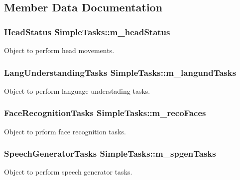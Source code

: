 \subsection{Member Data Documentation}
\subsubsection[{\texorpdfstring{m\+\_\+head\+Status}{m_headStatus}}]{\setlength{\rightskip}{0pt plus 5cm}Head\+Status Simple\+Tasks\+::m\+\_\+head\+Status\hspace{0.3cm}{\ttfamily [private]}}\hypertarget{class_simple_tasks_ad01bd034086c0ff10994e0afae9a3398}{}\label{class_simple_tasks_ad01bd034086c0ff10994e0afae9a3398}
Object to perform head movements. 
\subsubsection[{\texorpdfstring{m\+\_\+langund\+Tasks}{m_langundTasks}}]{\setlength{\rightskip}{0pt plus 5cm}Lang\+Understanding\+Tasks Simple\+Tasks\+::m\+\_\+langund\+Tasks\hspace{0.3cm}{\ttfamily [private]}}\hypertarget{class_simple_tasks_a4cf498d52ac2f3f0cf8eff17688a876d}{}\label{class_simple_tasks_a4cf498d52ac2f3f0cf8eff17688a876d}
Object to perform language understading tasks. 
\subsubsection[{\texorpdfstring{m\+\_\+reco\+Faces}{m_recoFaces}}]{\setlength{\rightskip}{0pt plus 5cm}Face\+Recognition\+Tasks Simple\+Tasks\+::m\+\_\+reco\+Faces\hspace{0.3cm}{\ttfamily [private]}}\hypertarget{class_simple_tasks_a7fb0ede1319b6a8acc7b4e733e494f40}{}\label{class_simple_tasks_a7fb0ede1319b6a8acc7b4e733e494f40}
Object to prform face recognition tasks. 
\subsubsection[{\texorpdfstring{m\+\_\+spgen\+Tasks}{m_spgenTasks}}]{\setlength{\rightskip}{0pt plus 5cm}Speech\+Generator\+Tasks Simple\+Tasks\+::m\+\_\+spgen\+Tasks\hspace{0.3cm}{\ttfamily [private]}}\hypertarget{class_simple_tasks_a6f47514f5e71977a2ff123311ad3dec2}{}\label{class_simple_tasks_a6f47514f5e71977a2ff123311ad3dec2}
Object to perform speech generator tasks. 

